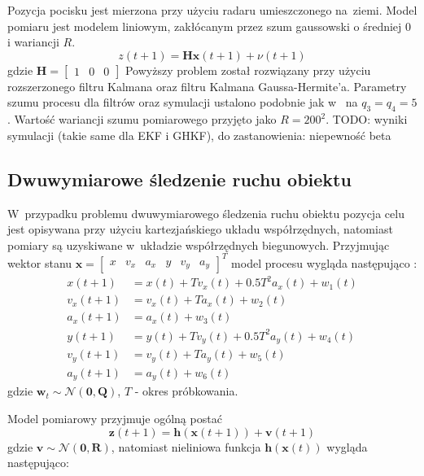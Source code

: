 Pozycja pocisku jest mierzona przy użyciu radaru umieszczonego na~ziemi. Model pomiaru jest modelem liniowym, zakłócanym przez szum gaussowski o średniej $0$ i wariancji $R$.
\begin{equation}
z(t+1) = \boldsymbol{H}\boldsymbol{x}(t+1) + \nu(t+1)
\end{equation}
gdzie $\boldsymbol{H} = \begin{bmatrix}
1 & 0 & 0
\end{bmatrix}$
Powyższy problem został rozwiązany przy użyciu rozszerzonego filtru Kalmana oraz filtru Kalmana Gaussa-Hermite'a. Parametry szumu procesu dla filtrów oraz symulacji ustalono podobnie jak w~\cite{MisslieTracking1} na $q_3=q_4=5$. Wartość wariancji szumu pomiarowego przyjęto jako $R=200^2$.
TODO: wyniki symulacji (takie same dla EKF i GHKF), do zastanowienia: niepewność beta
\subsection{Dwuwymiarowe śledzenie ruchu obiektu}
\label{subsec:2D_target_tracking}
W~przypadku problemu dwuwymiarowego śledzenia ruchu obiektu pozycja celu jest opisywana przy użyciu kartezjańskiego układu współrzędnych, natomiast pomiary są uzyskiwane w~układzie współrzędnych biegunowych. Przyjmując wektor stanu $\boldsymbol{x}=\begin{bmatrix}
x & v_x & a_x & y & v_y & a_y
\end{bmatrix}^T$ model procesu wygląda następująco \cite{Konatowski_2D_Tracking}:
\begin{align}\label{eq:2D_tracking_process_model}
x(t+1) &= x(t)+Tv_x(t)+0.5T^2a_x(t)+w_1(t) \nonumber \\
v_x(t+1) &= v_x(t)+Ta_x(t)+w_2(t) \nonumber \\
a_x(t+1) &= a_x(t)+w_3(t) \nonumber \\
y(t+1) &= y(t)+Tv_y(t)+0.5T^2a_y(t)+w_4(t) \nonumber \\
v_y(t+1) &= v_y(t)+Ta_y(t)+w_5(t) \nonumber \\
a_y(t+1) &= a_y(t)+w_6(t)
\end{align}
gdzie $\boldsymbol{w}_t\sim\mathcal{N}(\boldsymbol{0}, \boldsymbol{Q})$, $T$ - okres próbkowania.\par
Model pomiarowy przyjmuje ogólną postać
\begin{equation}
\boldsymbol{z}(t+1) = \boldsymbol{h}(\boldsymbol{x}(t+1)) + \boldsymbol{v}(t+1)
\end{equation}
gdzie $\boldsymbol{v} \sim \mathcal{N}(\boldsymbol{0}, \boldsymbol{R})$, natomiast nieliniowa funkcja $\boldsymbol{h}(\boldsymbol{x}(t))$ wygląda następująco:
